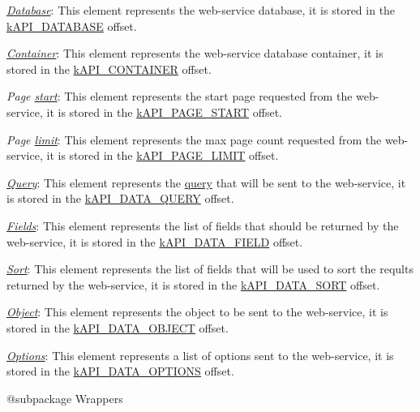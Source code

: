 \begin{DoxyItemize}
\item {\itshape \hyperlink{}{Database}}\-: This element represents the web-\/service database, it is stored in the \hyperlink{}{k\-A\-P\-I\-\_\-\-D\-A\-T\-A\-B\-A\-S\-E} offset. 
\item {\itshape \hyperlink{}{Container}}\-: This element represents the web-\/service database container, it is stored in the \hyperlink{}{k\-A\-P\-I\-\_\-\-C\-O\-N\-T\-A\-I\-N\-E\-R} offset. 
\item {\itshape Page \hyperlink{}{start}}\-: This element represents the start page requested from the web-\/service, it is stored in the \hyperlink{}{k\-A\-P\-I\-\_\-\-P\-A\-G\-E\-\_\-\-S\-T\-A\-R\-T} offset. 
\item {\itshape Page \hyperlink{}{limit}}\-: This element represents the max page count requested from the web-\/service, it is stored in the \hyperlink{}{k\-A\-P\-I\-\_\-\-P\-A\-G\-E\-\_\-\-L\-I\-M\-I\-T} offset. 
\item {\itshape \hyperlink{}{Query}}\-: This element represents the \hyperlink{class_c_query}{query} that will be sent to the web-\/service, it is stored in the \hyperlink{}{k\-A\-P\-I\-\_\-\-D\-A\-T\-A\-\_\-\-Q\-U\-E\-R\-Y} offset. 
\item {\itshape \hyperlink{}{Fields}}\-: This element represents the list of fields that should be returned by the web-\/service, it is stored in the \hyperlink{}{k\-A\-P\-I\-\_\-\-D\-A\-T\-A\-\_\-\-F\-I\-E\-L\-D} offset. 
\item {\itshape \hyperlink{}{Sort}}\-: This element represents the list of fields that will be used to sort the reqults returned by the web-\/service, it is stored in the \hyperlink{}{k\-A\-P\-I\-\_\-\-D\-A\-T\-A\-\_\-\-S\-O\-R\-T} offset. 
\item {\itshape \hyperlink{}{Object}}\-: This element represents the object to be sent to the web-\/service, it is stored in the \hyperlink{}{k\-A\-P\-I\-\_\-\-D\-A\-T\-A\-\_\-\-O\-B\-J\-E\-C\-T} offset. 
\item {\itshape \hyperlink{}{Options}}\-: This element represents a list of options sent to the web-\/service, it is stored in the \hyperlink{}{k\-A\-P\-I\-\_\-\-D\-A\-T\-A\-\_\-\-O\-P\-T\-I\-O\-N\-S} offset. 
\end{DoxyItemize}

\begin{DoxyVerb} @subpackage        Wrappers\end{DoxyVerb}


